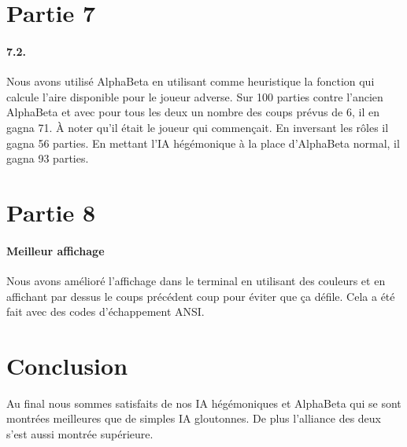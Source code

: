 \documentclass[a4paper]{article}
\begin{document}
    \section{Partie 7}
    \paragraph{7.2.} Nous avons utilisé AlphaBeta en utilisant comme
    heuristique la fonction qui calcule l'aire disponible pour le joueur
    adverse. Sur 100 parties contre l'ancien AlphaBeta et avec pour tous les
    deux un nombre des coups prévus de 6, il en gagna 71. À noter qu'il était
    le joueur qui commençait. En inversant les rôles il gagna 56 parties.
    En mettant l'IA hégémonique à la place d'AlphaBeta normal, il gagna 93
    parties.


    \section{Partie 8}
    \paragraph{Meilleur affichage} Nous avons amélioré l'affichage dans le
    terminal en utilisant des couleurs et en affichant par dessus le coups
    précédent coup pour éviter que ça défile. Cela a été fait avec des codes
    d'échappement ANSI.

    \section{Conclusion}
    Au final nous sommes satisfaits de nos IA hégémoniques et AlphaBeta qui se 
    sont montrées meilleures que de simples IA gloutonnes. De plus l'alliance 
    des deux s'est aussi montrée supérieure.
\end{document}
